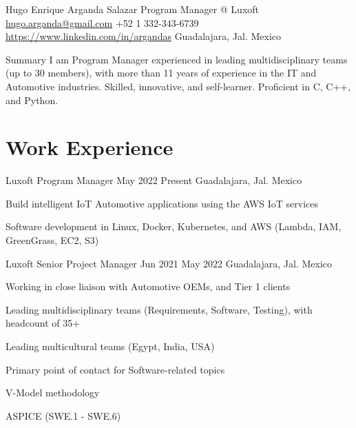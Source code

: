 \documentclass{resume} %
\begin{document}

\customheader
    {Hugo Enrique Arganda Salazar}
    {Program Manager @ Luxoft}
    {\href{mailto:hugo.arganda@gmail.com}{hugo.arganda@gmail.com}}
    {+52 1 332-343-6739}
    {\href{https://www.linkedin.com/in/argandas}{https://www.linkedin.com/in/argandas}}
    {Guadalajara, Jal. Mexico}



\summary
{Summary}
    {I am Program Manager experienced in leading multidisciplinary teams (up to 30 members), with more than 11 years of experience in the IT and Automotive industries. Skilled, innovative, and self-learner. Proficient in C, C++, and Python.}



\section{Work Experience}


\job
    {Luxoft}
    {Program Manager}
    {May 2022}
    {Present}
    {Guadalajara, Jal. Mexico}
    {
    \begin{itemize-bullets}
    \item{Build intelligent IoT Automotive applications using the AWS IoT services}
    \item{Software development in Linux, Docker, Kubernetes, and AWS (Lambda, IAM, GreenGrass, EC2, S3)}
    \end{itemize-bullets}
    }


\job
    {Luxoft}
    {Senior Project Manager}
    {Jun 2021}
    {May 2022}
    {Guadalajara, Jal. Mexico}
    {
    \begin{itemize-bullets}
    \item{Working in close liaison with Automotive OEMs, and Tier 1 clients}
    \item{Leading multidisciplinary teams (Requirements, Software, Testing), with headcount of 35+}
    \item{Leading multicultural teams (Egypt, India, USA)}
    \item{Primary point of contact for Software-related topics}
    \item{V-Model methodology}
    \item{ASPICE (SWE.1 - SWE.6)}
    \end{itemize-bullets}
    }
\end{document}
